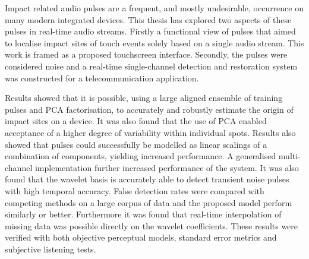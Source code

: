 


\begin{thesissummary}
Impact related audio pulses are a frequent, and mostly undesirable, occurrence on many modern integrated devices. This thesis has explored two aspects of these pulses in real-time audio streams. Firstly a functional view of pulses that aimed to localise impact sites of touch events solely based on a single audio stream. This work is framed as a proposed touchscreen interface. Secondly, the pulses were considered noise and a real-time single-channel detection and restoration system was constructed for a telecommunication application.

Results showed that it is possible, using a large aligned ensemble of training pulses and PCA factorisation, to accurately and robustly estimate the origin of impact sites on a device. It was also found that the use of PCA enabled acceptance of a higher degree of variability within individual spots. Results also showed that pulses could successfully be modelled as linear scalings of a combination of components, yielding increased performance. A generalised multi-channel implementation further increased performance of the system. It was also found that the wavelet basis is accurately able to detect transient noise pulses with high temporal accuracy. False detection rates were compared with competing methods on a large corpus of data and the proposed model perform similarly or better. Furthermore it was found that real-time interpolation of missing data was possible directly on the wavelet coefficients. These results were verified with both objective perceptual models, standard error metrics and subjective listening tests.



\end{thesissummary}




